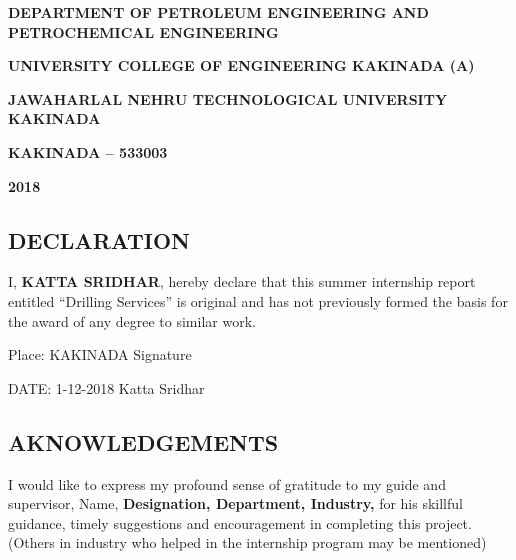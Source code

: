 \documentclass[11pt,a4paper]{report}
\begin{document}
\begin{titlepage}
\begin{center}
\vspace{1em}

\doublespacing

\large \textbf{DEPARTMENT OF PETROLEUM ENGINEERING AND \\ 
PETROCHEMICAL ENGINEERING}

\large \textbf{UNIVERSITY COLLEGE OF ENGINEERING KAKINADA (A)}

\large \textbf{JAWAHARLAL NEHRU TECHNOLOGICAL UNIVERSITY KAKINADA}

\large \textbf{KAKINADA – 533003}

\large \textbf{2018}

\end{center}
\end{titlepage}

\newpage

\begin{center}
\section*{DECLARATION}
\end{center}

\vspace{4em}


I, \textbf{KATTA SRIDHAR}, hereby declare that this summer internship report entitled “Drilling Services” is original and has not previously formed the basis for the award of any degree to similar work.


\vspace{5em}

\noindent Place: KAKINADA  \hfill Signature     \hspace{0.02\textwidth}

\vspace{1em}

\noindent DATE: 1-12-2018  \hfill Katta Sridhar


\newpage

\begin{center}
\section*{AKNOWLEDGEMENTS}
\end{center}


\vspace{1em}

I would like to express my profound sense of gratitude to my guide and supervisor, Name, \textbf{Designation, Department, Industry,} for his skillful guidance, timely suggestions and encouragement in completing this project. (Others in industry who helped in the internship program may be mentioned)
\end{document}
